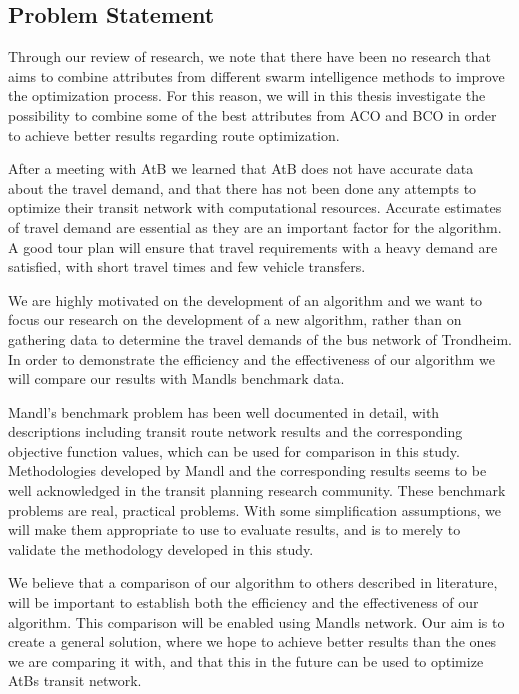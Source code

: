 \subsection{Problem Statement}

Through our review of research, we note that there have been no research that aims to combine attributes from different swarm intelligence methods to improve the optimization process. For this reason, we will in this thesis investigate the possibility to combine some of the best attributes from ACO and BCO in order to achieve better results regarding route optimization.

After a meeting with AtB we learned that AtB does not have accurate data about the travel demand, and that there has not been done any attempts to optimize their transit network with computational resources. Accurate estimates of travel demand are essential as they are an important factor for the algorithm. A good tour plan will ensure that travel requirements with a heavy demand are satisfied, with short travel times and few vehicle transfers. 

We are highly motivated on the development of an algorithm and we want to focus our research on the development of a new algorithm, rather than on gathering data to determine the travel demands of the bus network of Trondheim. In order to demonstrate the efficiency and the effectiveness of our algorithm we will compare our results with Mandls benchmark data. 

Mandl's benchmark problem has been well documented in detail, with descriptions including transit route network results and the corresponding objective function values, which can be used for comparison in this study. Methodologies developed by Mandl and the corresponding results seems to be well acknowledged in the transit planning research community. These benchmark problems are real, practical problems. With some simplification assumptions, we will make them appropriate to use to evaluate results, and is to merely to validate the methodology developed in this study. 

We believe that a comparison of our algorithm to others described in literature, will be important to establish both the efficiency and the effectiveness of our algorithm. This comparison will be enabled using Mandls network. Our aim is to create a general solution, where we hope to achieve better results than the ones we are comparing it with, and that this in the future can be used to optimize AtBs transit network. 

